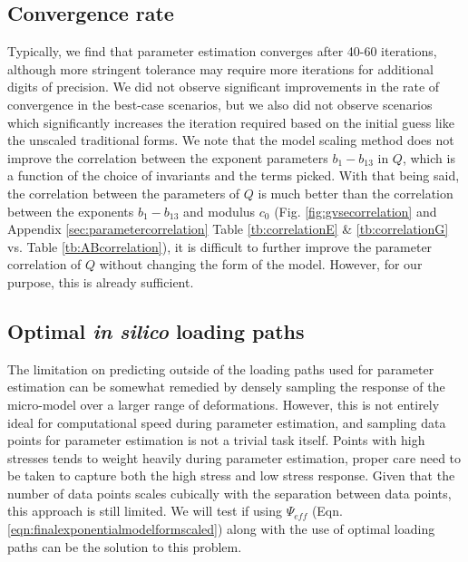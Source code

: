     
	
    
\subsection{Convergence rate}

	Typically, we find that parameter estimation converges after 40-60 iterations, although more stringent tolerance may require more iterations for additional digits of precision. We did not observe significant improvements in the rate of convergence in the best-case scenarios, but we also did not observe scenarios which significantly increases the iteration required based on the initial guess like the unscaled traditional forms. We note that the model scaling method does not improve the correlation between the exponent parameters $b_1-b_{13}$ in $Q$, which is a function of the choice of invariants and the terms picked. With that being said, the correlation between the parameters of $Q$ is much better than the correlation between the exponents $b_1-b_{13}$ and modulus $c_0$ (Fig. \ref{fig:gvsecorrelation} and Appendix \ref{sec:parametercorrelation} Table \ref{tb:correlationE} \& \ref{tb:correlationG} vs. Table \ref{tb:ABcorrelation}), it is difficult to further improve the parameter correlation of $Q$ without changing the form of the model. However, for our purpose, this is already sufficient. 

\subsection{Optimal \textit{in silico} loading paths}

	The limitation on predicting outside of the loading paths used for parameter estimation can be somewhat remedied by densely sampling the response of the micro-model over a larger range of deformations. However, this is not entirely ideal for computational speed during parameter estimation, and sampling data points for parameter estimation is not a trivial task itself. Points with high stresses tends to weight heavily during parameter estimation, proper care need to be taken to capture both the high stress and low stress response. Given that the number of data points scales cubically with the separation between data points, this approach is still limited. We will test if using $\Psi_{eff}$ (Eqn. \ref{eqn:finalexponentialmodelformscaled}) along with the use of optimal loading paths can be the solution to this problem. 

